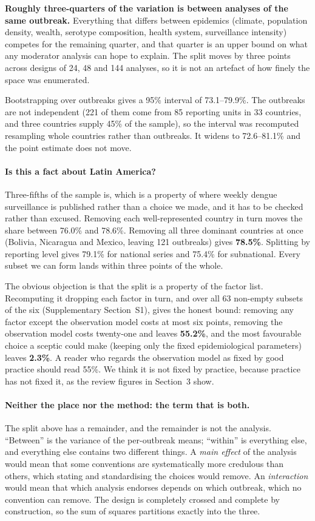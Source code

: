 \documentclass[11pt,a4paper]{article}
\begin{document}
\textbf{Roughly three-quarters of the variation is between analyses of the same
outbreak.} Everything that differs between epidemics (climate, population
density, wealth, serotype composition, health system, surveillance intensity)
competes for the remaining quarter, and that quarter is an upper bound on what
any moderator analysis can hope to explain. The split moves by three points
across designs of 24, 48 and 144 analyses, so it is not an artefact of how finely
the space was enumerated.

Bootstrapping over outbreaks gives a 95\% interval of 73.1--79.9\%. The outbreaks
are not independent (221 of them come from 85 reporting units in 33 countries,
and three countries supply 45\% of the sample), so the interval was recomputed
resampling whole countries rather than outbreaks. It widens to 72.6--81.1\% and
the point estimate does not move.

\paragraph{Is this a fact about Latin America?} Three-fifths of the sample is,
which is a property of where weekly dengue surveillance is published rather than a
choice we made, and it has to be checked rather than excused. Removing each
well-represented country in turn moves the share between 76.0\% and 78.6\%.
Removing all three dominant countries at once (Bolivia, Nicaragua and Mexico,
leaving 121 outbreaks) gives \textbf{78.5\%}. Splitting by reporting level gives
79.1\% for national series and 75.4\% for subnational. Every subset we can form
lands within three points of the whole.

The obvious objection is that the split is a property of the factor list.
Recomputing it dropping each factor in turn, and over all 63 non-empty subsets
of the six (Supplementary Section~S1), gives the honest bound: removing any
factor except the observation model costs at most six points, removing the
observation model costs twenty-one and leaves \textbf{55.2\%}, and the most
favourable choice a sceptic could make (keeping only the fixed epidemiological
parameters) leaves \textbf{2.3\%}. A reader who regards the observation model
as fixed by good practice should read 55\%. We think it is not fixed by practice,
because practice has not fixed it, as the review figures in Section~3 show.

\paragraph{Neither the place nor the method: the term that is both.} The split
above has a remainder, and the remainder is not the analysis. ``Between'' is the
variance of the per-outbreak means; ``within'' is everything else, and everything
else contains two different things. A \emph{main effect} of the analysis would
mean that some conventions are systematically more credulous than others, which
stating and standardising the choices would remove. An \emph{interaction} would
mean that which analysis endorses depends on which outbreak, which no convention
can remove. The design is completely crossed and complete by construction, so the
sum of squares partitions exactly into the three.
\end{document}
